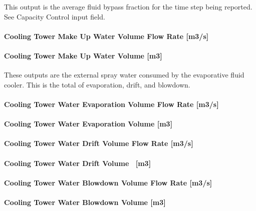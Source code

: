 This output is the average fluid bypass fraction for the time step being reported. See Capacity Control input field.

\paragraph{Cooling Tower Make Up Water Volume Flow Rate {[}m3/s{]}}\label{cooling-tower-make-up-water-volume-flow-rate-m3s-4}

\paragraph{Cooling Tower Make Up Water Volume {[}m3{]}}\label{cooling-tower-make-up-water-volume-m3-4}

These outputs are the external spray water consumed by the evaporative fluid cooler. This is the total of evaporation, drift, and blowdown.

\paragraph{Cooling Tower Water Evaporation Volume Flow Rate {[}m3/s{]}}\label{cooling-tower-water-evaporation-volume-flow-rate-m3s-4}

\paragraph{Cooling Tower Water Evaporation Volume {[}m3{]}}\label{cooling-tower-water-evaporation-volume-m3-4}

\paragraph{Cooling Tower Water Drift Volume Flow Rate {[}m3/s{]}}\label{cooling-tower-water-drift-volume-flow-rate-m3s-4}

\paragraph{Cooling Tower Water Drift Volume~ {[}m3{]}}\label{cooling-tower-water-drift-volume-m3-4}

\paragraph{Cooling Tower Water Blowdown Volume Flow Rate {[}m3/s{]}}\label{cooling-tower-water-blowdown-volume-flow-rate-m3s-4}

\paragraph{Cooling Tower Water Blowdown Volume {[}m3{]}}\label{cooling-tower-water-blowdown-volume-m3-4}

